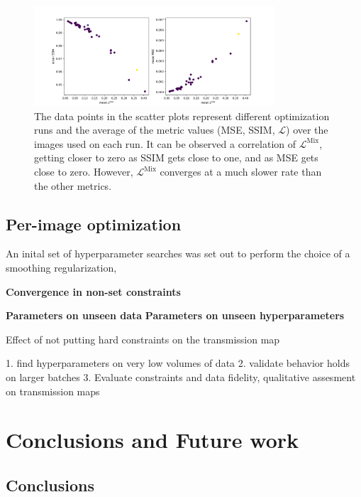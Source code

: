 \documentclass[nomenclature, english, bibtex]{kththesis}
\numberwithin{listing}{chapter}
\begin{document}
\begin{figure}
    \centering
    \includegraphics[width=0.8\textwidth]{figures/L_mix.png}
    \caption{The data points in the scatter plots represent different optimization runs and the average of the metric values
    (MSE, SSIM, $\mathcal{L}$) over the images used on each run. It can be observed a correlation of $\mathcal{L}^{\text{Mix}}$,
    getting closer to zero as SSIM gets close to one, and as MSE gets close to zero. However, $\mathcal{L}^{\text{Mix}}$
    converges at a much slower rate than the other metrics.}
    \label{fig:transmission_maps}
\end{figure}

\section{Per-image optimization}

An inital set of hyperparameter searches was set out to perform the choice of a smoothing regularization,


\textbf{Convergence in non-set constraints}

\textbf{Parameters on unseen data}
\textbf{Parameters on unseen hyperparameters}


Effect of not putting hard constraints on the transmission map



1. find hyperparameters on very low volumes of data
2. validate behavior holds on larger batches
3. Evaluate constraints and data fidelity, qualitative assesment on transmission maps



\cleardoublepage
\chapter{Conclusions and Future work}
\label{ch:conclusionsAndFutureWork}

\section{Conclusions}
\label{sec:conclusions}
\end{document}
